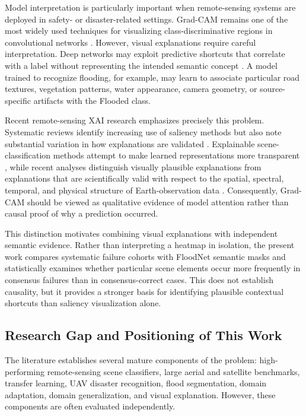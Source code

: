 Model interpretation is particularly important when remote-sensing systems are deployed in safety- or disaster-related settings. Grad-CAM remains one of the most widely used techniques for visualizing class-discriminative regions in convolutional networks \cite{selvaraju2017gradcam}. However, visual explanations require careful interpretation. Deep networks may exploit predictive shortcuts that correlate with a label without representing the intended semantic concept \cite{geirhos2020shortcut}. A model trained to recognize flooding, for example, may learn to associate particular road textures, vegetation patterns, water appearance, camera geometry, or source-specific artifacts with the Flooded class.

Recent remote-sensing XAI research emphasizes precisely this problem. Systematic reviews identify increasing use of saliency methods but also note substantial variation in how explanations are validated \cite{hohl2024xaireview}. Explainable scene-classification methods attempt to make learned representations more transparent \cite{gu2026explainablemultiview}, while recent analyses distinguish visually plausible explanations from explanations that are scientifically valid with respect to the spatial, spectral, temporal, and physical structure of Earth-observation data \cite{dritsas2026validity}. Consequently, Grad-CAM should be viewed as qualitative evidence of model attention rather than causal proof of why a prediction occurred.

This distinction motivates combining visual explanations with independent semantic evidence. Rather than interpreting a heatmap in isolation, the present work compares systematic failure cohorts with FloodNet semantic masks and statistically examines whether particular scene elements occur more frequently in consensus failures than in consensus-correct cases. This does not establish causality, but it provides a stronger basis for identifying plausible contextual shortcuts than saliency visualization alone.

\subsection{Research Gap and Positioning of This Work}

The literature establishes several mature components of the problem: high-performing remote-sensing scene classifiers, large aerial and satellite benchmarks, transfer learning, UAV disaster recognition, flood segmentation, domain adaptation, domain generalization, and visual explanation. However, these components are often evaluated independently.

